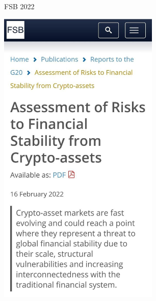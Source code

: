 \begin{frame}
\begin{columns}
\begin{column}{0.5\textwidth}
    
    \end{column}
    \begin{column}{0.5\textwidth}  %
        \begin{block}{FSB 2022}
        
        
        \begin{center}
         \includegraphics[width=0.6\textwidth]{images/C1/FSB 2022}
         \end{center}
             \end{block}
             

\end{column}
\end{columns}
\end{frame}
